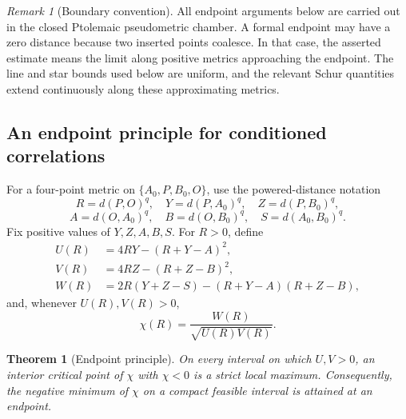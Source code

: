 \documentclass[11pt]{amsart}
\newtheorem{theorem}{Theorem}[section]
\theoremstyle{definition}
\theoremstyle{remark}
\newtheorem{remark}[remark]{Remark}
\begin{document}
\begin{remark}[Boundary convention]\label{rem:pseudometric-boundary}
All endpoint arguments below are carried out in the closed Ptolemaic pseudometric chamber. A formal endpoint may have a zero distance because two inserted points coalesce. In that case, the asserted estimate means the limit along positive metrics approaching the endpoint. The line and star bounds used below are uniform, and the relevant Schur quantities extend continuously along these approximating metrics.
\end{remark}

\subsection{An endpoint principle for conditioned correlations}

For a four-point metric on $\{A_0,P,B_0,O\}$, use the powered-distance
notation
\[
 R=d(P,O)^q,
 \quad Y=d(P,A_0)^q,
 \quad Z=d(P,B_0)^q,
\]
\[
 A=d(O,A_0)^q,
 \quad B=d(O,B_0)^q,
 \quad S=d(A_0,B_0)^q.
\]
Fix positive values of \(Y,Z,A,B,S\). For \(R>0\), define
\begin{align}
 U(R)&=4RY-(R+Y-A)^2,\label{eq:UR}\\
 V(R)&=4RZ-(R+Z-B)^2,\label{eq:VR}\\
 W(R)&=2R(Y+Z-S)-(R+Y-A)(R+Z-B),\label{eq:WR}
\end{align}
and, whenever \(U(R),V(R)>0\),
\begin{equation}\label{eq:chiR}
 \chi(R)=\frac{W(R)}{\sqrt{U(R)V(R)}}.
\end{equation}

\begin{theorem}[Endpoint principle]\label{thm:endpoint-principle}
On every interval on which \(U,V>0\), an interior critical point of \(\chi\) with \(\chi<0\) is a strict local maximum. Consequently, the negative minimum of \(\chi\) on a compact feasible interval is attained at an endpoint.
\end{theorem}
\end{document}
